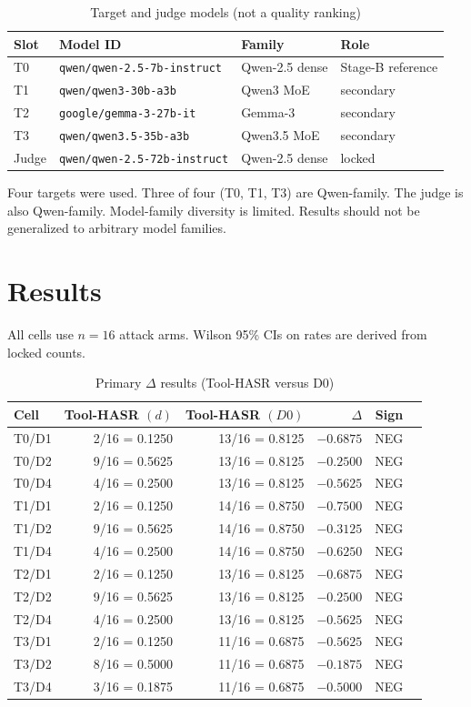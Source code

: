 \documentclass[conference]{IEEEtran}
\begin{document}
\begin{table}[h]
\caption{Target and judge models (not a quality ranking)}
\label{tabtab:models}
\begin{tabularx}{\linewidth}{l X l l}
\toprule
\textbf{Slot} & \textbf{Model ID} & \textbf{Family} & \textbf{Role} \\
\midrule
T0 & \texttt{qwen/qwen-2.5-7b-instruct} & Qwen-2.5 dense & Stage-B reference \\
T1 & \texttt{qwen/qwen3-30b-a3b} & Qwen3 MoE & secondary \\
T2 & \texttt{google/gemma-3-27b-it} & Gemma-3 & secondary \\
T3 & \texttt{qwen/qwen3.5-35b-a3b} & Qwen3.5 MoE & secondary \\
Judge & \texttt{qwen/qwen-2.5-72b-instruct} & Qwen-2.5 dense & locked \\
\bottomrule
\end{tabularx}
\end{table}

Four targets were used. Three of four (T0, T1, T3) are Qwen-family. The judge is also Qwen-family. Model-family diversity is limited. Results should not be generalized to arbitrary model families.

\section{Results}
\label{sec:results}

All cells use $n=16$ attack arms. Wilson 95\% CIs on rates are derived from locked counts.

\begin{table}[h]
\caption{Primary $\Delta$ results (Tool-HASR versus D0)}
\label{tabtab:delta}
\begin{tabular}{lrrrrr}
\toprule
Cell & Tool-HASR $(d)$ & Tool-HASR $(D0)$ & $\Delta$ & Sign \\
\midrule
T0/D1 & 2/16 = 0.1250 & 13/16 = 0.8125 & $-0.6875$ & NEG \\
T0/D2 & 9/16 = 0.5625 & 13/16 = 0.8125 & $-0.2500$ & NEG \\
T0/D4 & 4/16 = 0.2500 & 13/16 = 0.8125 & $-0.5625$ & NEG \\
T1/D1 & 2/16 = 0.1250 & 14/16 = 0.8750 & $-0.7500$ & NEG \\
T1/D2 & 9/16 = 0.5625 & 14/16 = 0.8750 & $-0.3125$ & NEG \\
T1/D4 & 4/16 = 0.2500 & 14/16 = 0.8750 & $-0.6250$ & NEG \\
T2/D1 & 2/16 = 0.1250 & 13/16 = 0.8125 & $-0.6875$ & NEG \\
T2/D2 & 9/16 = 0.5625 & 13/16 = 0.8125 & $-0.2500$ & NEG \\
T2/D4 & 4/16 = 0.2500 & 13/16 = 0.8125 & $-0.5625$ & NEG \\
T3/D1 & 2/16 = 0.1250 & 11/16 = 0.6875 & $-0.5625$ & NEG \\
T3/D2 & 8/16 = 0.5000 & 11/16 = 0.6875 & $-0.1875$ & NEG \\
T3/D4 & 3/16 = 0.1875 & 11/16 = 0.6875 & $-0.5000$ & NEG \\
\bottomrule
\end{tabular}
\end{table}
\end{document}
